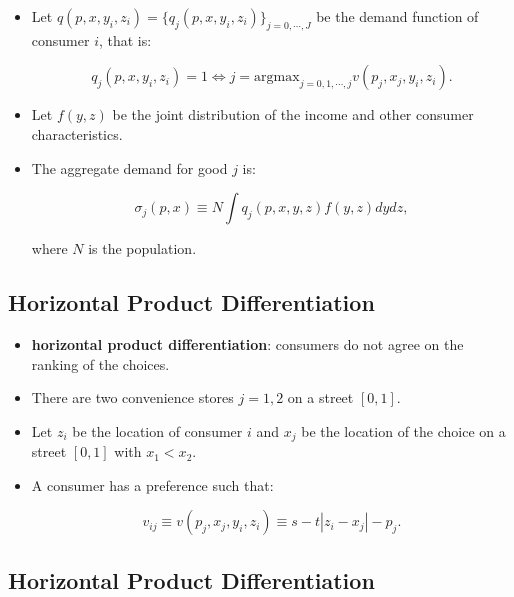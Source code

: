 \documentclass[]{book}
\providecommand{\tightlist}{%
  \setlength{\itemsep}{0pt}\setlength{\parskip}{0pt}}
\begin{document}
\begin{itemize}
\tightlist
\item
  Let \(q(p, x, y_i, z_i) = \{q_j(p, x, y_i, z_i)\}_{j = 0, \cdots, J}\)
  be the demand function of consumer \(i\), that is:

  \begin{equation}
  q_j(p, x, y_i, z_i) = 1 \Leftrightarrow j = \text{argmax}_{j = 0, 1, \cdots, j}  v(p_j, x_j, y_i, z_i).
  \end{equation}
\item
  Let \(f(y, z)\) be the joint distribution of the income and other
  consumer characteristics.
\item
  The aggregate demand for good \(j\) is:

  \begin{equation}
  \sigma_j(p, x) \equiv N \int  q_j(p, x, y, z) f(y, z) dy dz,
  \end{equation}

  where \(N\) is the population.
\end{itemize}

\subsection{Horizontal Product
Differentiation}\label{horizontal-product-differentiation}

\begin{itemize}
\tightlist
\item
  \textbf{horizontal product differentiation}: consumers do not agree on
  the ranking of the choices.
\item
  There are two convenience stores \(j = 1, 2\) on a street \([0, 1]\).
\item
  Let \(z_i\) be the location of consumer \(i\) and \(x_j\) be the
  location of the choice on a street \([0, 1]\) with \(x_1 < x_2\).
\item
  A consumer has a preference such that:

  \begin{equation}
  v_{ij} \equiv v(p_j, x_j, y_i, z_i) \equiv s - t |z_i - x_j| - p_j.
  \end{equation}
\end{itemize}

\subsection{Horizontal Product
Differentiation}\label{horizontal-product-differentiation-1}
\end{document}
